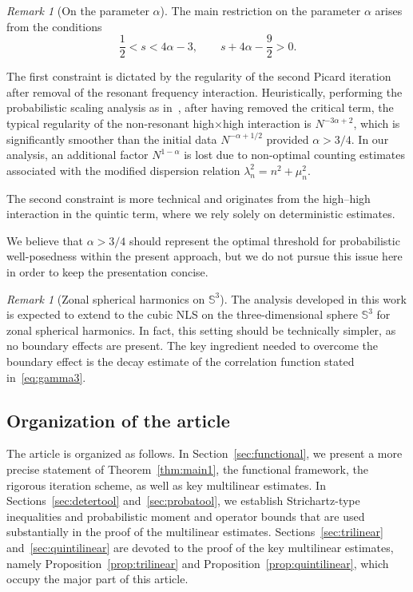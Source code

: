 \documentclass[11pt,reqno,english]{amsart}
\numberwithin{equation}{section}
\theoremstyle{plain}
\theoremstyle{definition}
\theoremstyle{remark}
\newtheorem{remark}[theorem]{Remark}
\begin{document}
\begin{remark}[On the parameter $\alpha$]
	\label{rem:alpha}
	The main restriction on the parameter $\alpha$ arises from the conditions
	\[
	\frac12<s<4\alpha-3,
	\qquad
	s+4\alpha-\frac{9}{2}>0.
	\]

	The first constraint is dictated by the regularity of the second Picard iteration after removal of the resonant frequency interaction.
	Heuristically, performing the probabilistic scaling analysis as in~\cite{DNY24,DNY22}, after having removed the critical term, the typical regularity of the non-resonant high$\times$high interaction is $N^{-3\alpha+2}$, which is significantly smoother than the initial data $N^{-\alpha+1/2}$ provided $\alpha>3/4$.
	In our analysis, an additional factor $N^{1-\alpha}$ is lost due to non-optimal counting estimates associated with the modified dispersion relation $\lambda_n^2=n^2+\mu_n^2$.

	The second constraint is more technical and originates from the high--high interaction in the quintic term, where we rely solely on deterministic estimates.
	
	We believe that $\alpha>3/4$ should represent the optimal threshold for probabilistic well-posedness within the present approach, but we do not pursue this issue here in order to keep the presentation concise.
\end{remark}

\begin{remark}[Zonal spherical harmonics on $\mathbb{S}^{3}$]
	The analysis developed in this work is expected to extend to the cubic NLS on the three-dimensional sphere $\mathbb{S}^{3}$ for zonal spherical harmonics.
	In fact, this setting should be technically simpler, as no boundary effects are present. The key ingredient needed to overcome the boundary effect is the decay estimate of the correlation function stated in~\eqref{eq:gamma3}.
\end{remark}


\subsection{Organization of the article}
The article is organized as follows. In Section~\ref{sec:functional}, we present a more precise statement of Theorem~\ref{thm:main1}, the functional framework, the rigorous iteration scheme, as well as key multilinear estimates. In Sections~\ref{sec:detertool} and~\ref{sec:probatool}, we establish Strichartz-type inequalities and probabilistic moment and operator bounds that are used substantially in the proof of the multilinear estimates. Sections~\ref{sec:trilinear} and~\ref{sec:quintilinear} are devoted to the proof of the key multilinear estimates, namely Proposition~\ref{prop:trilinear} and Proposition~\ref{prop:quintilinear}, which occupy the major part of this article.
\end{document}

